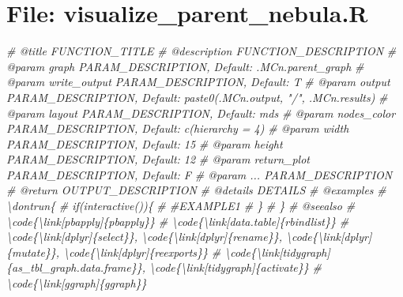 \documentclass[
]{article}
\newenvironment{Shaded}{\begin{snugshade}}{\end{snugshade}}
\newcommand{\CommentTok}[1]{\textcolor[rgb]{0.56,0.35,0.01}{\textit{#1}}}
\begin{document}
\hypertarget{file-visualize_parent_nebula.r}{%
\section{File: visualize\_parent\_nebula.R}\label{file-visualize_parent_nebula.r}}

\begin{Shaded}
\begin{Highlighting}[]
\CommentTok{\#\textquotesingle{} @title FUNCTION\_TITLE}
\CommentTok{\#\textquotesingle{} @description FUNCTION\_DESCRIPTION}
\CommentTok{\#\textquotesingle{} @param graph PARAM\_DESCRIPTION, Default: .MCn.parent\_graph}
\CommentTok{\#\textquotesingle{} @param write\_output PARAM\_DESCRIPTION, Default: T}
\CommentTok{\#\textquotesingle{} @param output PARAM\_DESCRIPTION, Default: paste0(.MCn.output, "/", .MCn.results)}
\CommentTok{\#\textquotesingle{} @param layout PARAM\_DESCRIPTION, Default: \textquotesingle{}mds\textquotesingle{}}
\CommentTok{\#\textquotesingle{} @param nodes\_color PARAM\_DESCRIPTION, Default: c(hierarchy = 4)}
\CommentTok{\#\textquotesingle{} @param width PARAM\_DESCRIPTION, Default: 15}
\CommentTok{\#\textquotesingle{} @param height PARAM\_DESCRIPTION, Default: 12}
\CommentTok{\#\textquotesingle{} @param return\_plot PARAM\_DESCRIPTION, Default: F}
\CommentTok{\#\textquotesingle{} @param ... PARAM\_DESCRIPTION}
\CommentTok{\#\textquotesingle{} @return OUTPUT\_DESCRIPTION}
\CommentTok{\#\textquotesingle{} @details DETAILS}
\CommentTok{\#\textquotesingle{} @examples }
\CommentTok{\#\textquotesingle{} \textbackslash{}dontrun\{}
\CommentTok{\#\textquotesingle{} if(interactive())\{}
\CommentTok{\#\textquotesingle{}  \#EXAMPLE1}
\CommentTok{\#\textquotesingle{}  \}}
\CommentTok{\#\textquotesingle{} \}}
\CommentTok{\#\textquotesingle{} @seealso }
\CommentTok{\#\textquotesingle{}  \textbackslash{}code\{\textbackslash{}link[pbapply]\{pbapply\}\}}
\CommentTok{\#\textquotesingle{}  \textbackslash{}code\{\textbackslash{}link[data.table]\{rbindlist\}\}}
\CommentTok{\#\textquotesingle{}  \textbackslash{}code\{\textbackslash{}link[dplyr]\{select\}\}, \textbackslash{}code\{\textbackslash{}link[dplyr]\{rename\}\}, \textbackslash{}code\{\textbackslash{}link[dplyr]\{mutate\}\}, \textbackslash{}code\{\textbackslash{}link[dplyr]\{reexports\}\}}
\CommentTok{\#\textquotesingle{}  \textbackslash{}code\{\textbackslash{}link[tidygraph]\{as\_tbl\_graph.data.frame\}\}, \textbackslash{}code\{\textbackslash{}link[tidygraph]\{activate\}\}}
\CommentTok{\#\textquotesingle{}  \textbackslash{}code\{\textbackslash{}link[ggraph]\{ggraph\}\}}

\end{Highlighting}
\end{Shaded}
\end{document}
